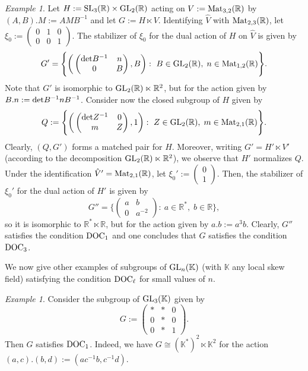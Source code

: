 \documentclass[a4paper,11pt,reqno]{amsart}
\numberwithin{equation}{section}
\theoremstyle{remark}
\newtheorem{example}[theorem]{Example}
\theoremstyle{definition}
\newcommand{\R}{{\mathbb R}}
\newcommand{\K}{\mathbb K}
\begin{document}
\begin{example}
\label{E1}
Let $H:={\rm SL}_3(\R)\times  {\rm GL}_2(\R)$ acting on $V:={\rm Mat}_{3,2}(\R)$ by $(A,B).M:=AMB^{-1}$ and let $G:=H\ltimes V$. Identifying $\hat V$
with ${\rm Mat}_{2,3}(\R)$,   let $\xi_0:=\begin{pmatrix}0&1&0\\0&0&1\end{pmatrix}$. The stabilizer of $\xi_0$ for the dual action of $H$ on $\hat V$ is given by
$$
G'=\Bigg\{\bigg(\begin{pmatrix} {\rm det}B^{-1}&n\\0&B\end{pmatrix},B\bigg):\ B\in  {\rm GL}_2(\R), \; n\in{\rm Mat}_{1,2}(\R)\Bigg\}.
$$
Note that $G'$ is isomorphic to ${\rm GL}_2(\R)\ltimes\R^2$, but for the action given by $B.n:={\rm det}B^{-1} nB^{-1}$.
Consider now the closed subgroup of $H$ given by
$$
Q:=\Bigg\{\bigg(\begin{pmatrix} {\rm det}Z^{-1}&0\\m&Z\end{pmatrix}, 1\bigg):\ Z\in  {\rm GL}_2(\R), \; m\in{\rm Mat}_{2,1}(\R)\Bigg\}.
$$
Clearly, $(Q,G')$ forms a matched pair for $H$. Moreover, writing $G'=H'\ltimes V'$ (according to the decomposition ${\rm GL}_2(\R)\ltimes\R^2$),
we observe that $H'$ normalizes $Q$. Under the identification $\hat V'={\rm Mat}_{2,1}(\R)$,
let $\xi_0':=\begin{pmatrix}0\\1\end{pmatrix}$. Then, the stabilizer of $\xi_0'$ for the dual action of $H'$ is given by
$$
G''=\bigg\{\begin{pmatrix} a&b\\0&a^{-2}\end{pmatrix}:\ a\in\R^*,\;b\in\R \bigg\},
$$
so it is isomorphic to $\R^*\ltimes\R$, but for the action given by $a.b:=a^3 b$. Clearly, $G''$ satisfies  the condition ${\rm DOC_1}$
and one concludes that $G$ satisfies  the condition ${\rm DOC_3}$.
\end{example}

We now give other examples of subgroups of ${\rm GL}_n(\K)$ (with $\K$ any local skew field) satisfying the condition ${\rm DOC_\ell}$ for small values of $n$.


\begin{example}
\label{E2}
Consider the subgroup of ${\rm GL}_3(\K)$ given by
$$
G:=\begin{pmatrix}
*&*&0\\0&*&0\\
0&*&1\end{pmatrix}.
$$
Then  $G$
satisfies   ${\rm DOC_1}$. Indeed, we have $G\cong (\K^*)^2\ltimes \K^2$ for the action $(a,c).(b,d):=(ac^{-1} b,c^{-1} d)$.
\end{example}
\end{document}
